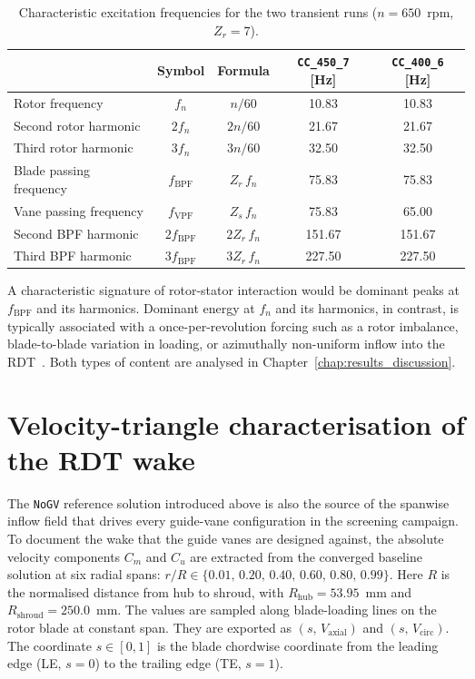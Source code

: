 \begin{table}[H]
\centering
\caption{Characteristic excitation frequencies for the two transient runs ($n = 650$~rpm, $Z_r=7$).}
\label{tab:characteristic_freqs}
\begin{tabular}{lcccc}
\hline
 & Symbol & Formula & \texttt{CC\_450\_7} [Hz] & \texttt{CC\_400\_6} [Hz] \\ \hline
Rotor frequency           & $f_n$               & $n/60$         & 10.83  & 10.83  \\
Second rotor harmonic     & $2f_n$              & $2n/60$        & 21.67  & 21.67  \\
Third rotor harmonic      & $3f_n$              & $3n/60$        & 32.50  & 32.50  \\
Blade passing frequency   & $f_{\mathrm{BPF}}$  & $Z_r\,f_n$     & 75.83  & 75.83  \\
Vane passing frequency    & $f_{\mathrm{VPF}}$  & $Z_s\,f_n$     & 75.83  & 65.00  \\
Second BPF harmonic       & $2f_{\mathrm{BPF}}$ & $2Z_r\,f_n$    & 151.67 & 151.67 \\
Third BPF harmonic        & $3f_{\mathrm{BPF}}$ & $3Z_r\,f_n$    & 227.50 & 227.50 \\ \hline
\end{tabular}
\end{table}
 
A characteristic signature of rotor-stator interaction would be dominant peaks at $f_{\mathrm{BPF}}$ and its harmonics. Dominant energy at $f_n$ and its harmonics, in contrast, is typically associated with a once-per-revolution forcing such as a rotor imbalance, blade-to-blade variation in loading, or azimuthally non-uniform inflow into the RDT~\cite{Brekke2015,Bergan2018}. Both types of content are analysed in Chapter~\ref{chap:results_discussion}.

\section{Velocity-triangle characterisation of the RDT wake}
\label{sec:methods_rdt_velocity_triangles}
 
The \texttt{NoGV} reference solution introduced above is also the source of the spanwise inflow field that drives every guide-vane configuration in the screening campaign. To document the wake that the guide vanes are designed against, the absolute velocity components $C_m$ and $C_u$ are extracted from the converged baseline solution at six radial spans: $r/R \in \{0.01,\,0.20,\,0.40,\,0.60,\,0.80,\,0.99\}$. Here $R$ is the normalised distance from hub to shroud, with $R_{\mathrm{hub}}=53.95$~mm and $R_{\mathrm{shroud}}=250.0$~mm. The values are sampled along blade-loading lines on the rotor blade at constant span. They are exported as $(s,\,V_{\mathrm{axial}})$ and $(s,\,V_{\mathrm{circ}})$. The coordinate $s\in[0,1]$ is the blade chordwise coordinate from the leading edge (LE, $s=0$) to the trailing edge (TE, $s=1$).
 
